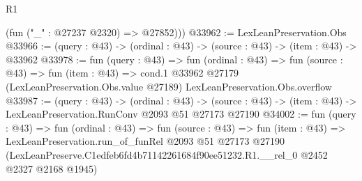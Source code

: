 \begin{lexlean}{R1}
\begin{coremodule}
        (fun ("_" : @27237 @2320) => @27852)))
@33962 := LexLeanPreservation.Obs
@33966 := (query : @43) -> (ordinal : @43) -> (source : @43) -> (item : @43) -> @33962
@33978 := fun (query : @43) =>
  fun (ordinal : @43) =>
  fun (source : @43) =>
  fun (item : @43) =>
  cond.{1} @33962 @27179 (LexLeanPreservation.Obs.value @27189) LexLeanPreservation.Obs.overflow
@33987 := (query : @43) ->
  (ordinal : @43) ->
  (source : @43) -> (item : @43) -> LexLeanPreservation.RunConv @2093 @51 @27173 @27190
@34002 := fun (query : @43) =>
  fun (ordinal : @43) =>
  fun (source : @43) =>
  fun (item : @43) =>
  LexLeanPreservation.run_of_funRel
    @2093
    @51
    @27173
    @27190
    (LexLeanPreserve.C1edfeb6fd4b71142261684f90ee51232.R1.__rel_0 @2452 @2327 @2168 @1945)
\end{coremodule}
\end{lexlean}
